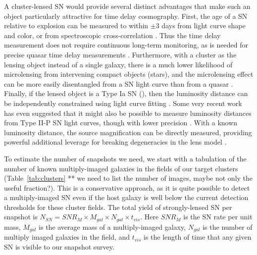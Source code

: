 A cluster-lensed SN would provide several distinct advantages that
make such an object particularly attractive for time delay
cosmography. First, the age of a SN relative to explosion can be
measured to within $\pm$3 days from light curve shape and color, or
from spectroscopic cross-correlation \citep{Filippenko:1997,
Blondin:2007}.  Thus the time delay measurement does not require
continuous long-term monitoring, as is needed for precise quasar time
delay measurements \citep[e.g.][]{Fohlmeister:2013, Tewes:2013a}.
Furthermore, with a cluster as the lensing object instead of a single
galaxy, there is a much lower likelihood of microlensing from
intervening compact objects (stars), and the microlensing effect can
be more easily disentangled from a SN light curve than from a
quasar \citep{Kolatt:1998,Tewes:2013b}.  Finally, if the lensed object
is a Type Ia SN (\SNIa), then the luminosity distance can be
independently constrained using light curve
fitting \citep{Phillips:1993}.  Some very recent work has even
suggested that it might also be possible to measure luminosity
distances from Type II-P SN light curves, though with lower
precision \citep{Anderson:2014, Sanders:2014}. With a known luminosity
distance, the source magnification can be directly measured, providing
powerful additional leverage for breaking degeneracies in the lens
model \citep{Kolatt:1998,Oguri:2003}.


% 
% 

\medskip
{} 
To estimate the number of snapshots we need, we start with a
tabulation of the number of known multiply-imaged galaxies in the
fields of our target clusters (Table~\ref{tab:clusters} ** we need to
list the number of images, maybe not only the useful fraction?).  This
is a conservative approach, as it is quite possible to detect a
multiply-imaged SN even if the host galaxy is well below the current
detection thresholds for these cluster fields. The total yield of
strongly-lensed SN per snapshot is $N_{SN} = SNR_{M} \times
M_{gal} \times N_{gal} \times t_{vis}$.  Here $SNR_M$ is the SN rate
per unit mass, $M_{gal}$ is the average mass of a multiply-imaged
galaxy, $N_{gal}$ is the number of multiply imaged galaxies in the
field, and $t_{vis}$ is the length of time that any given SN is
visible to our snapshot survey.

